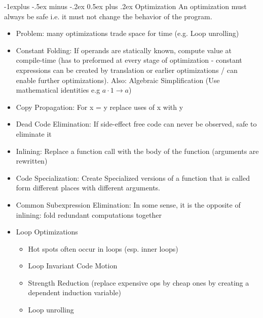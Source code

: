 \documentclass[10pt,landscape]{article}
\makeatletter
\renewcommand{\subsection}{\@startsection{subsection}{2}{0mm}%
                                {-1explus -.5ex minus -.2ex}%
                                {0.5ex plus .2ex}%
                                {\normalfont\normalsize\bfseries}}
\makeatother
\begin{document}
\begin{multicols}{3}
\subsection{Optimization}
An optimization must always be safe i.e. it must not change the behavior of the program.
\begin{itemize}
	\item Problem: many optimizations trade space for time (e.g. Loop unrolling)
	\item Constant Folding: If operands are statically known, compute value at compile-time (has to preformed at every stage of optimization - constant expressions can be created by translation or earlier optimizations / can enable further optimizations). Also: Algebraic Simplification (Use mathematical identities e.g $a \cdot 1 \rightarrow a$)
	\item Copy Propagation: For x = y replace uses of x with y
	\item Dead Code Elimination: If side-effect free code can never be observed, safe to eliminate it
	\item Inlining: Replace a function call with the body of the function (arguments are rewritten)
	\item Code Specialization: Create Specialized versions of a function that is called form different places with different arguments.
	\item Common Subexpression Elimination: In some sense, it is the opposite of inlining: fold redundant computations together
	\item Loop Optimizations
	\begin{itemize}
		\item Hot spots often occur in loops (esp. inner loops)
		\item Loop Invariant Code Motion
		\item Strength Reduction (replace expensive ops by cheap ones by creating a dependent induction variable)
		\item Loop unrolling
	\end{itemize}
\end{itemize}

\end{multicols}
\end{document}
